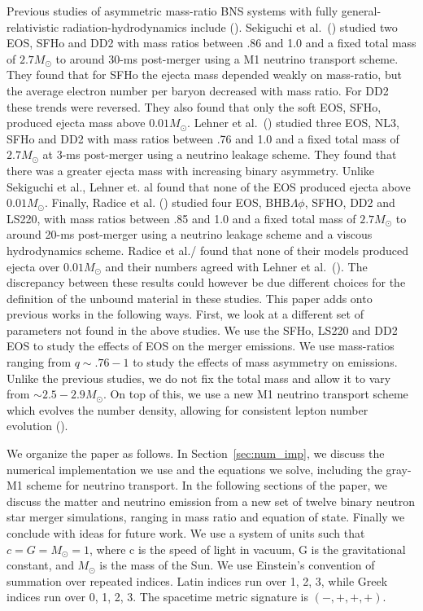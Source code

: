Previous studies of asymmetric mass-ratio BNS systems with fully general-relativistic radiation-hydrodynamics include
(\cite{sekiguchi2016dynamical,lehner2016unequal,radice2018binary}). Sekiguchi et al.~(\cite{sekiguchi2016dynamical}) studied two EOS, SFHo and DD2 with mass ratios between .86 and 1.0 and a fixed total mass of $2.7M_\odot$ to around 30-ms post-merger using a M1 neutrino transport scheme. They found that for SFHo the ejecta mass depended weakly on mass-ratio, but the average electron number per baryon decreased with mass ratio. For DD2 these trends were reversed. They also found that only the soft EOS, SFHo, produced ejecta mass above $0.01M_\odot$. Lehner et al.~(\cite{lehner2016unequal}) studied three EOS, NL3, SFHo and DD2 with mass ratios between .76 and 1.0 and a fixed total mass of $2.7M_\odot$ at 3-ms post-merger using a neutrino leakage scheme. They found that there was a greater ejecta mass with increasing binary asymmetry. Unlike Sekiguchi et al., Lehner et. al found that none of the EOS produced ejecta above $0.01M_\odot$. Finally, Radice et al. (\cite{radice2018binary}) studied four EOS, BHB$\Lambda\phi$, SFHO, DD2 and LS220, with mass ratios between .85 and 1.0 and a fixed total mass of $2.7M_\odot$ to around 20-ms post-merger  using a neutrino leakage scheme and a viscous hydrodynamics scheme. Radice et al./ found that  none of their models produced ejecta over $0.01M_\odot$ and their numbers agreed with Lehner et al.~(\cite{lehner2016unequal}). The discrepancy between these results could however be due different choices for the definition of the unbound material in these studies. This paper adds onto previous works in the following ways. First, we look at a different set of parameters not found in the above studies. We use the SFHo, LS220 and DD2 EOS to study the effects of EOS on the merger emissions. We use mass-ratios ranging from $q \sim.76-1$ to study the effects of mass asymmetry on emissions. Unlike the previous studies, we do not fix the total mass and allow it to vary from $\sim 2.5-2.9M_\odot$. On top of this, we use a new M1 neutrino transport scheme which evolves the number density, allowing for consistent lepton number evolution (\cite{foucart:2016rxm}). 

We organize the paper as follows. In Section~\ref{sec:num_imp}, we discuss the numerical implementation we use and the
equations we solve, including the gray-M1 scheme for neutrino transport. In the following
sections of the paper, we discuss the matter and neutrino emission from a new set of
twelve binary neutron star merger simulations, ranging in mass ratio and equation of state.
Finally we conclude with ideas for future work. We use a system of units such
that $c = G = M_\odot = 1$, where c is the speed of light in
vacuum, G is the gravitational constant, and $M_\odot$ is the mass
of the Sun. We use Einstein's convention of summation over
repeated indices. Latin indices run over 1, 2, 3, while Greek
indices run over 0, 1, 2, 3. The spacetime metric signature is $(-,+,+,+)$.


